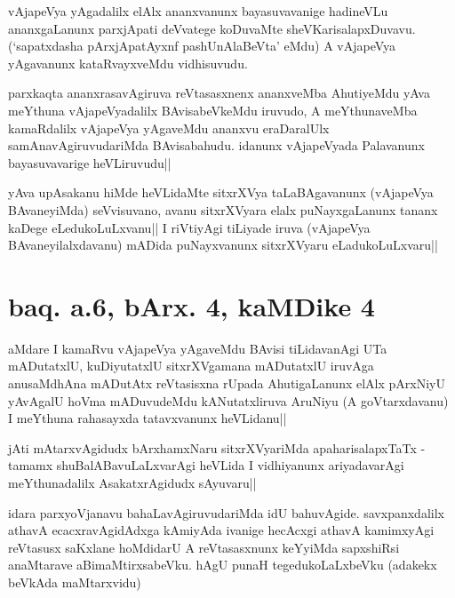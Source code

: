 \begin{artha}
vAjapeVya yAgadalilx elAlx ananxvanunx bayasuvavanige hadineVLu 
ananxgaLanunx parxjApati deVvatege koDuvaMte sheVKarisalapxDuvavu. 
(`sapatxdasha pArxjApatAyxnf pashUnAlaBeVta' eMdu) A vAjapeVya 
yAgavanunx kataRvayxveMdu vidhisuvudu.
\end{artha}

\begin{artha}
parxkaqta ananxrasavAgiruva reVtasasxnenx ananxveMba AhutiyeMdu yAva 
meYthuna vAjapeVyadalilx BAvisabeVkeMdu iruvudo, A meYthunaveMba 
kamaRdalilx vAjapeVya yAgaveMdu ananxvu eraDaralUlx 
samAnavAgiruvudariMda BAvisabahudu. idanunx vAjapeVyada Palavanunx 
bayasuvavarige heVLiruvudu||
\end{artha}


\begin{artha}
yAva upAsakanu hiMde heVLidaMte sitxrXVya taLaBAgavanunx (vAjapeVya 
BAvaneyiMda) seVvisuvano, avanu sitxrXVyara elalx puNayxgaLanunx 
tananx kaDege eLedukoLuLxvanu|| \stext I riVtiyAgi tiLiyade iruva 
(vAjapeVya BAvaneyilalxdavanu) mADida puNayxvanunx sitxrXVyaru 
eLadukoLuLxvaru||
\end{artha}

\section*{baq. a.6, bArx. 4, kaMDike 4}

\stext

\begin{artha}
aMdare I kamaRvu vAjapeVya yAgaveMdu BAvisi tiLidavanAgi UTa 
mADutatxlU, kuDiyutatxlU sitxrXVgamana mADutatxlU iruvAga anusaMdhAna 
mADutAtx reVtasisxna rUpada AhutigaLanunx elAlx pArxNiyU yAvAgalU 
hoVma mADuvudeMdu kANutatxliruva AruNiyu (A goVtarxdavanu) I meYthuna 
rahasayxda tatavxvanunx heVLidanu||
\end{artha}


\begin{artha}
jAti mAtarxvAgidudx bArxhamxNaru sitxrXVyariMda apaharisalapxTaTx - 
tamamx shuBalABavuLaLxvarAgi heVLida I vidhiyanunx ariyadavarAgi 
meYthunadalilx AsakatxrAgidudx sAyuvaru||
\end{artha}

\begin{artha}
idara parxyoVjanavu bahaLavAgiruvudariMda idU bahuvAgide. 
savxpanxdalilx athavA ecacxravAgidAdxga kAmiyAda ivanige hecAcxgi 
athavA kamimxyAgi reVtasusx saKxlane hoMdidarU A reVtasasxnunx 
keYyiMda sapxshiRsi anaMtarave aBimaMtirxsabeVku. hAgU punaH 
tegedukoLaLxbeVku (adakekx beVkAda maMtarxvidu)
\end{artha}

